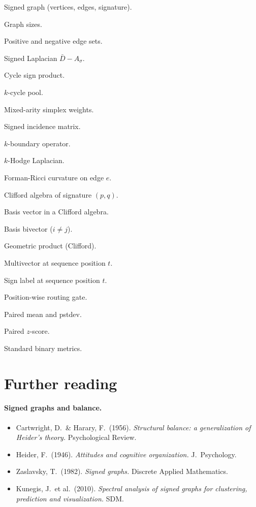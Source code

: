 \documentclass[11pt,a4paper]{article}
\theoremstyle{remark}
\DeclareMathOperator{\Ric}{Ric}
\DeclareMathOperator{\AUC}{AUC}
\newcommand{\gp}{\otimes_{\mathrm{Cl}}}
\newcommand{\Cl}[2]{\mathrm{Cl}(#1, #2)}
\begin{document}
\begin{description}[font=\normalfont, leftmargin=2.4cm, style=nextline]
\item[$G = (V, E, \sigma)$] Signed graph (vertices, edges, signature).
\item[$n = |V|, m = |E|$] Graph sizes.
\item[$E^+, E^-$] Positive and negative edge sets.
\item[$L_\sigma$] Signed Laplacian $\bar D - A_\sigma$.
\item[$\sigma(c)$] Cycle sign product.
\item[$\mathcal{C}_k(G)$] $k$-cycle pool.
\item[$\alpha_k$] Mixed-arity simplex weights.
\item[$M_\sigma$] Signed incidence matrix.
\item[$\partial_k$] $k$-boundary operator.
\item[$\Delta_k$] $k$-Hodge Laplacian.
\item[$\Ric_F(e)$] Forman-Ricci curvature on edge $e$.
\item[$\Cl{p}{q}$] Clifford algebra of signature $(p, q)$.
\item[$e_i$] Basis vector in a Clifford algebra.
\item[$e_{ij} = e_i e_j$] Basis bivector ($i \neq j$).
\item[$\gp$] Geometric product (Clifford).
\item[$x_t$] Multivector at sequence position $t$.
\item[$\sigma_t$] Sign label at sequence position $t$.
\item[$g_t$] Position-wise routing gate.
\item[$\bar\delta, s_\delta$] Paired mean and pstdev.
\item[$z$] Paired $z$-score.
\item[$\AUC, \mathrm{acc}, F_1^{\text{macro}}$] Standard binary metrics.
\end{description}

\section{Further reading}

\paragraph{Signed graphs and balance.}
\begin{itemize}
\item Cartwright, D.\ \& Harary, F.\ (1956). \emph{Structural balance: a generalization of Heider's theory.} Psychological Review.
\item Heider, F.\ (1946). \emph{Attitudes and cognitive organization.} J.\ Psychology.
\item Zaslavsky, T.\ (1982). \emph{Signed graphs.} Discrete Applied Mathematics.
\item Kunegis, J.\ et al.\ (2010). \emph{Spectral analysis of signed graphs for clustering, prediction and visualization.} SDM.
\end{itemize}
\end{document}
